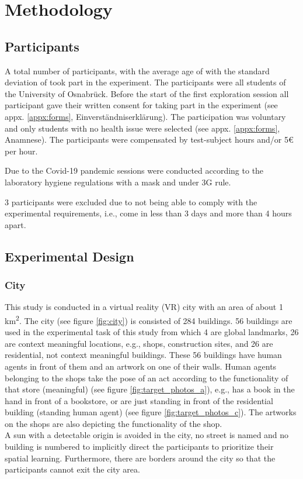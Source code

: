 \chapter{Methodology}

\section{Participants}

A total number of  participants,  with the average age of  with the standard deviation of  took part in the experiment. The participants were all students of the University of Osnabrück. Before the start of the first exploration session all participant gave their written consent for taking part in the experiment (see appx. \ref{appx:forms}, Einverständniserklärung). The participation was voluntary and only students with no health issue were selected (see appx. \ref{appx:forms}, Anamnese). The participants were compensated by test-subject hours and/or 5€ per hour.  

Due to the Covid-19 pandemic sessions were conducted according to the laboratory hygiene regulations with a mask and under 3G rule.

3 participants were excluded due to not being able to comply with the experimental requirements, i.e., come in less than 3 days and more than 4 hours apart.



\section{Experimental Design}

\subsection{City}

This study is conducted in a virtual reality (VR) city with an area of about 1 km\textsuperscript2. The city (see figure \ref{fig:city}) is consisted of 284 buildings. 56 buildings are used in the experimental task of this study from which 4 are global landmarks, 26 are {\emphasize context meaningful} locations, e.g., shops, construction sites, and 26 are residential, {\emphasize not context meaningful} buildings. These 56 buildings have human agents in front of them and an artwork on one of their walls. Human agents belonging to the shops take the pose of an act according to the functionality of that store {\emphasize(meaningful)} (see figure \ref{fig:target_photos_a}), e.g., has a book in the hand in front of a bookstore, or are just standing in front of the residential building {\emphasize(standing human agent)} (see figure \ref{fig:target_photos_c}). The artworks on the shops are also depicting the functionality of the shop.\\
A sun with a detectable origin is avoided in the city, no street is named and no building is numbered to implicitly direct the participants to prioritize their spatial learning. Furthermore, there are borders around the city so that the participants cannot exit the city area.

